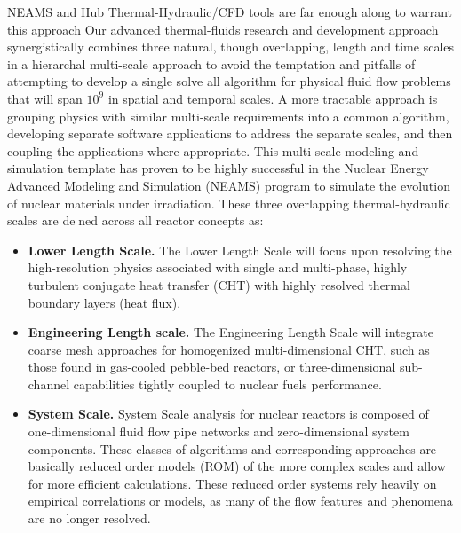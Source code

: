 NEAMS and Hub Thermal-Hydraulic/CFD tools are far enough along to warrant this approach
Our advanced thermal-fluids research and development approach synergistically combines three natural,
though overlapping, length and time scales in a hierarchal multi-scale approach to avoid the temptation and
pitfalls of attempting to develop a single solve all algorithm for physical fluid flow problems that will span
$10^{9}$ in spatial and temporal scales. A more tractable approach is grouping physics with similar multi-scale
requirements into a common algorithm, developing separate software applications to address the separate
scales, and then coupling the applications where appropriate. This multi-scale modeling and simulation
template has proven to be highly successful in the Nuclear Energy Advanced Modeling and Simulation
(NEAMS) program to simulate the evolution of nuclear materials under irradiation. These three overlapping
thermal-hydraulic scales are dened across all reactor concepts as:
\begin{itemize}
    \item \textbf{Lower Length Scale.} The Lower Length Scale will focus upon resolving the high-resolution physics
    associated with single and multi-phase, highly turbulent conjugate heat transfer (CHT) with highly
    resolved thermal boundary layers (heat flux).
    \item \textbf{Engineering Length scale.} The Engineering Length Scale will integrate coarse mesh approaches
    for homogenized multi-dimensional CHT, such as those found in gas-cooled pebble-bed reactors, or three-dimensional sub-channel capabilities tightly coupled to nuclear fuels performance.
    \item \textbf{System Scale.} System Scale analysis for nuclear reactors is composed of one-dimensional fluid flow
    pipe networks and zero-dimensional system components. These classes of algorithms and corresponding approaches are basically reduced order models (ROM) of the more complex scales and allow for more efficient calculations. These reduced order systems rely heavily on empirical correlations or models, as many of the flow features and phenomena are no longer resolved.
\end{itemize}

